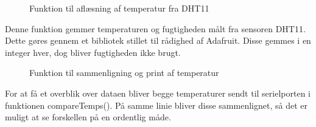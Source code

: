 \begin{figure}[h!]
  \centering
  \caption{Funktion til aflæsning af temperatur fra DHT11}
  \label{dht11Measure}
\end{figure}
Denne funktion gemmer temperaturen og fugtigheden målt fra sensoren DHT11. Dette gøres gennem et bibliotek stillet til rådighed af Adafruit.\newline
{}
Disse gemmes i en integer hver, dog bliver fugtigheden ikke brugt.

\begin{figure}[h!]
  \centering
  \caption{Funktion til sammenligning og print af temperatur}
  \label{compareTemp}
\end{figure}
For at få et overblik over dataen bliver begge temperaturer sendt til serielporten i funktionen compareTemps(). På samme linie bliver disse sammenlignet, så det er muligt at se forskellen på en ordentlig måde.



